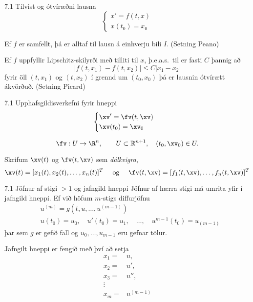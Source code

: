 \begin{frame}{7.1 Tilvist og ótvíræðni lausna} 
\begin{equation*}
\begin{cases}
x' = f(t,x)\\
x(t_0) = x_0
\end{cases}
\end{equation*}

Ef $f$ er samfellt, þá er alltaf til lausn á einhverju bili $I$. 
(Setning Peano)

\pause
\smallskip
Ef $f$ uppfyllir Lipschitz-skilyrði með tilliti til $x$, 
þ.e.a.s.~til er fasti $C$ þannig að 
\begin{equation*}
|f(t,x_1) - f(t,x_2)| \leq C|x_1 - x_2|
\end{equation*}
fyrir öll $(t,x_1)$ og $(t,x_2)$ í grennd um $(t_0, x_0)$ þá er
lausnin ótvírætt ákvörðuð. (Setning Picard) 
\end{frame}


\begin{frame}{7.1 Upphafsgildisverkefni fyrir hneppi} 
\begin{equation*}
\begin{cases}
\xv' =\fv(t,\xv)\\
\xv(t_0) = \xv_0
\end{cases}
\end{equation*}

$$
\fv: U \rightarrow \R^n, \qquad U\subset \mathbb{R}^{n+1}, \quad
(t_0,\xv_0) \in U.
$$ 

\pause
\smallskip
Skrifum  $\xv(t)$ og $\fv(t,\xv)$ sem {\it dálkvigra},
$$\xv(t) = [x_1(t), x_2(t), \ldots , x_n(t)]^T
\quad \text{  og } \quad 
\fv(t,\xv) = [f_1(t,\xv), \ldots , f_n(t, \xv)]^T
$$
\end{frame}


\begin{frame}{7.1 Jöfnur af stigi $>1$ og jafngild hneppi}
Jöfnur af hærra stigi má umrita yfir í jafngild hneppi. 
Ef við höfum $m$-stigs diffurjöfnu
\begin{align*}
&u^{(m)} = g(t,u, \ldots , u^{(m-1)})\\
&u(t_0) = u_0, \quad u'(t_0) = u_1, \quad \ldots, \quad  u^{m-1}(t_0) = u_{(m-1)}
\end{align*}
þar sem $g$ er gefið fall og $u_0, \ldots , u_{m-1}$ eru gefnar tölur.

\pause
\smallskip
Jafngilt hneppi er fengið með því að setja 
\begin{align*}
x_1 =& u, \\
x_2 =& u', \\
x_3 =& u'', \\
\vdots& \\
x_m =& u^{(m-1)}
\end{align*}
\end{frame}


